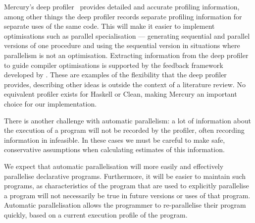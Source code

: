 Mercury's deep profiler~\citep{conway:2001:mercury-deep} provides
detailed and accurate profiling information,
among other things the deep profiler records separate profiling
information for separate uses of the same code.
This will make it easier to implement optimisations such as
parallel specialisation --- generating sequential and parallel
versions of one procedure and using the sequential version
in situations where parallelism is not an optimisation.
Extracting information from the deep profiler to guide compiler
optimisations is supported by the feedback framework developed by
\citet{bone:2008:hons}.
These are examples of the flexibility that the deep profiler provides,
describing other ideas is outside the context of a literature review.
No equivalent profiler exists for Haskell or Clean, making Mercury an
important choice for our implementation.

There is another challenge with automatic parallelism: a lot of
information about the execution of a program will not be recorded by the
profiler, often recording information in infeasible.
In these cases we must be careful to make safe, conservative
assumptions when calculating estimates of this information.



We expect that automatic parallelisation will more easily and
effectively parallelise declarative programs.
Furthermore, it will be easier to maintain such programs, as
characteristics of the program that are used to explicitly parallelise
a program will not necessarily be true in future versions or uses of that
program.
Automatic parallelisation allows the programmer to re-parallelise
their program quickly, based on a current execution profile of the
program.

